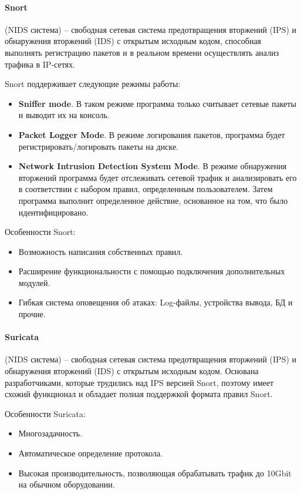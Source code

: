 \paragraph*{Snort} (NIDS система) -- свободная сетевая система предотвращения вторжений (IPS) и 
обнаружения вторжений (IDS) с открытым исходным кодом, способная выполнять регистрацию пакетов и в реальном 
времени осуществлять анализ трафика в IP-сетях. 

Snort поддерживает следующие режимы работы:
\begin{itemize}
	\item \textbf{Sniffer mode}. В таком режиме программа только считывает сетевые пакеты и выводит 
	их на консоль. 
	\item \textbf{Packet Logger Mode}. В режиме логирования пакетов, программа будет 
	регистрировать/логировать пакеты на диске.
	\item \textbf{Network Intrusion Detection System Mode}. В режиме обнаружения вторжений 
	программа будет отслеживать сетевой трафик и анализировать его в соответствии с набором правил, 
	определенным пользователем. Затем программа выполнит определенное действие, основанное на том, 
	что было идентифицировано.
\end{itemize}

Особенности Snort:
\begin{itemize}
	\item Возможность написания собственных правил.
	\item Расширение функциональности с помощью подключения дополнительных модулей.
	\item Гибкая система оповещения об атаках: Log-файлы, устройства вывода, БД и прочие.
\end{itemize}


\paragraph*{Suricata} (NIDS система) -- свободная сетевая система предотвращения вторжений (IPS) и 
обнаружения вторжений (IDS) с открытым исходным кодом. Основана разработчиками, которые трудились над IPS версией Snort,
поэтому имеет схожий функционал и обладает полная поддержкой формата правил Snort.

Особенности Suricata:
\begin{itemize}
	\item Многозадачность.
	\item Автоматическое определение протокола.
	\item Высокая производительность, позволяющая обрабатывать трафик до 10Gbit на обычном оборудовании.
\end{itemize}


